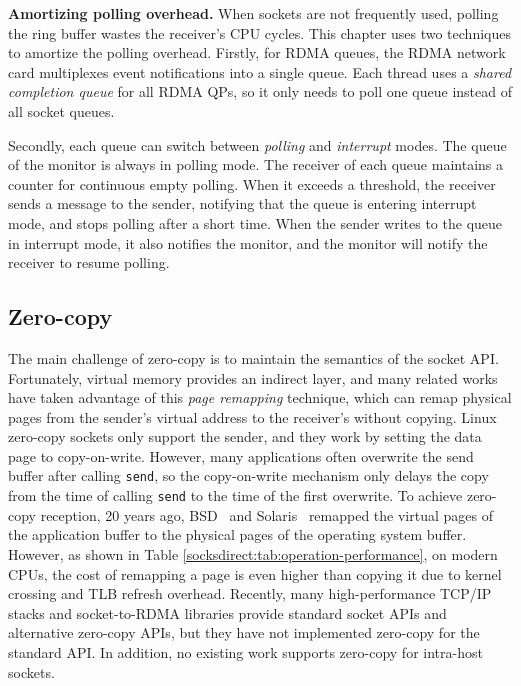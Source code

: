 \textbf{Amortizing polling overhead.}
When sockets are not frequently used, polling the ring buffer wastes the receiver's CPU cycles. This chapter uses two techniques to amortize the polling overhead.
Firstly, for RDMA queues, the RDMA network card multiplexes event notifications into a single queue.
Each thread uses a \emph{shared completion queue} for all RDMA QPs, so it only needs to poll one queue instead of all socket queues.

Secondly, each queue can switch between \textit{polling} and \textit{interrupt} modes. The queue of the monitor is always in polling mode. The receiver of each queue maintains a counter for continuous empty polling. When it exceeds a threshold, the receiver sends a message to the sender, notifying that the queue is entering interrupt mode, and stops polling after a short time. When the sender writes to the queue in interrupt mode, it also notifies the monitor, and the monitor will notify the receiver to resume polling.


\subsection{Zero-copy}
\label{socksdirect:subsec:zerocopy}

The main challenge of zero-copy is to maintain the semantics of the socket API. Fortunately, virtual memory provides an indirect layer, and many related works have taken advantage of this \emph{page remapping} technique, which can remap physical pages from the sender's virtual address to the receiver's without copying. Linux zero-copy sockets \cite{linux-zero-copy} only support the sender, and they work by setting the data page to copy-on-write. However, many applications often overwrite the send buffer after calling \texttt{send}, so the copy-on-write mechanism only delays the copy from the time of calling \texttt{send} to the time of the first overwrite. To achieve zero-copy reception, 20 years ago, BSD~\cite{thadani1995efficient} and Solaris~\cite{chu1996zero} remapped the virtual pages of the application buffer to the physical pages of the operating system buffer. However, as shown in Table \ref{socksdirect:tab:operation-performance}, on modern CPUs, the cost of remapping a page is even higher than copying it due to kernel crossing and TLB refresh overhead. Recently, many high-performance TCP/IP stacks \cite{han2012megapipe,yasukata2016stackmap} and socket-to-RDMA libraries \cite{rsockets,socketsdirect} provide standard socket APIs and alternative zero-copy APIs, but they have not implemented zero-copy for the standard API. In addition, no existing work supports zero-copy for intra-host sockets.

